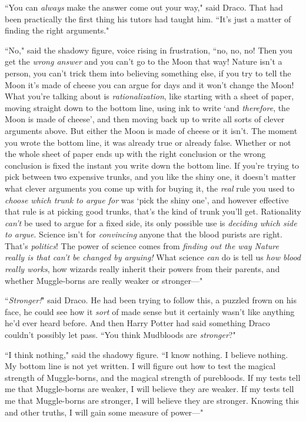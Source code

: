 ``You can \emph{always} make the answer come out your way," said Draco. That had been practically the first thing his tutors had taught him. ``It's just a matter of finding the right arguments."

``No," said the shadowy figure, voice rising in frustration, ``no, no, no! Then you get the \emph{wrong answer} and you can't go to the Moon that way! Nature isn't a person, you can't trick them into believing something else, if you try to tell the Moon it's made of cheese you can argue for days and it won't change the Moon! What you're talking about is \emph{rationalization}, like starting with a sheet of paper, moving straight down to the bottom line, using ink to write `and \emph{therefore}, the Moon is made of cheese', and then moving back up to write all sorts of clever arguments above. But either the Moon is made of cheese or it isn't. The moment you wrote the bottom line, it was already true or already false. Whether or not the whole sheet of paper ends up with the right conclusion or the wrong conclusion is fixed the instant you write down the bottom line. If you're trying to pick between two expensive trunks, and you like the shiny one, it doesn't matter what clever arguments you come up with for buying it, the \emph{real} rule you used to \emph{choose which trunk to argue for} was `pick the shiny one', and however effective that rule is at picking good trunks, that's the kind of trunk you'll get. Rationality \emph{can't} be used to argue for a fixed side, its only possible use is \emph{deciding which side to argue}. Science isn't for \emph{convincing} anyone that the blood purists are right. That's \emph{politics}! The power of science comes from \emph{finding out the way Nature really is that can't be changed by arguing!} What science \emph{can} do is tell us \emph{how blood really works}, how wizards really inherit their powers from their parents, and whether Muggle-borns are really weaker or stronger—"

``\emph{Stronger!}" said Draco. He had been trying to follow this, a puzzled frown on his face, he could see how it \emph{sort} of made sense but it certainly wasn't like anything he'd ever heard before. And then Harry Potter had said something Draco couldn't possibly let pass. ``You think Mudbloods are \emph{stronger}?"

``I think nothing," said the shadowy figure. ``I know nothing. I believe nothing. My bottom line is not yet written. I will figure out how to test the magical strength of Muggle-borns, and the magical strength of purebloods. If my tests tell me that Muggle-borns are weaker, I will believe they are weaker. If my tests tell me that Muggle-borns are stronger, I will believe they are stronger. Knowing this and other truths, I will gain some measure of power—"

